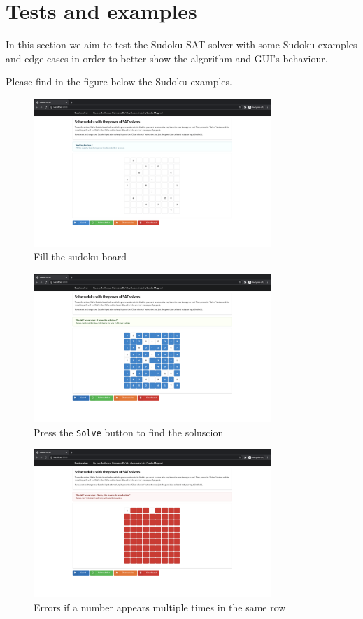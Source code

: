 \documentclass[]{usiinfprospectus}
\newcounter{row}
\begin{document}
\newpage

\section{Tests and examples}\label{trials}

In this section we aim to test the Sudoku SAT solver with some Sudoku examples
and edge cases in order to better show the algorithm and GUI's behaviour.

Please
find in the figure below the Sudoku examples.

\begin{figure}[ht]
\centering
\includegraphics[width=0.8\textwidth]{pics/fill_board.png}
\caption{Fill the sudoku board}
\end{figure}

\begin{figure}[ht]
\centering
\includegraphics[width=0.8\textwidth]{pics/solved.png}
\caption{Press the \texttt{Solve} button to find the soluscion}
\end{figure}

\begin{figure}[ht]
\centering
\includegraphics[width=0.8\textwidth]{pics/row_check.png}
\caption{Errors if a number appears multiple times in the same row}
\end{figure}
\end{document}
